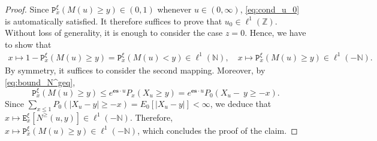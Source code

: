 \documentclass[12pt,reqno,oneside]{amsart}
\numberwithin{equation}{section}
\theoremstyle{definition}
\theoremstyle{remark}
\newcommand{\N}{\mathbb{N}}
\newcommand{\es}{\mathbf{es}}
\begin{document}
\begin{proof}[Proof]
  Since $\mathtt{P}^\xi_x(M(u) \geq y) \in (0,1)$ whenever
  $u \in (0,\infty)$, \eqref{eq:cond_u_0} is automatically satisfied. It
  therefore suffices to prove that $u_0\in \ell^1(\mathbb Z)$. Without loss
  of generality, it is enough to consider the case $z=0$. Hence, we have to
  show that
  \begin{align*}
    x \mapsto 1-\mathtt{P}_x^\xi(M(u)\geq y)
    =  \mathtt{P}_x^\xi(M(u)< y) \in \ell^1(\N), \quad
    x \mapsto \mathtt{P}_{x}^\xi(M(u)\geq y) \in \ell^1(-\N).
  \end{align*}
  By symmetry, it suffices to consider the second mapping.
  Moreover, by \eqref{eq:bound_N^geq},
  \begin{equation*}
    \mathtt{P}_{x}^\xi(M(u)\geq y) \leq e^{\es \cdot
      u}P_{x}(X_u \geq y)=e^{\es \cdot u}P_{0}(X_u - \ y \geq -x).
  \end{equation*}
  Since $\sum_{x \leq 1} P_0(|X_u-y| \geq -x) = E_0[|X_u-y|]< \infty$, we
  deduce that $x \mapsto \mathtt{E}_{x}^\xi[N^{\geq}(u,y)] \in \ell^1(- \N)$.
  Therefore, $x \mapsto \mathtt{P}_{x}^\xi(M(u) \geq y) \in  \ell^1(- \N)$,
  which concludes the proof of the claim.
\end{proof}
\end{document}
